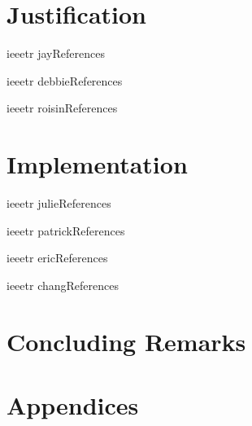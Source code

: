 \documentclass[10pt]{book} %
\begin{document}


\chapter{Justification}


{ieeetr}
{jay}{References}
\clearpage


{ieeetr}
{debbie}{References}
\clearpage


{ieeetr}
{roisin}{References}
\clearpage

\chapter{Implementation}


{ieeetr}
{julie}{References}
\clearpage


{ieeetr}
{patrick}{References}
\clearpage


{ieeetr}
{eric}{References}
\clearpage


{ieeetr}
{chang}{References}
\clearpage

\chapter{Concluding Remarks}

\chapter*{Appendices}


%
%
\end{document}
